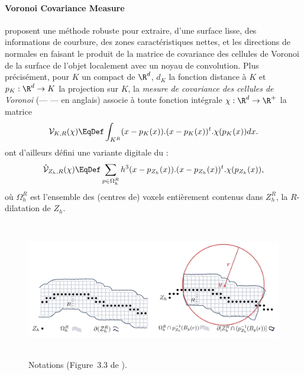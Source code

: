 \paragraph{Voronoi Covariance Measure}

 proposent une méthode robuste pour
extraire, d'une surface lisse, des informations de courbure, des zones caractéristiques
nettes, et les directions de normales en faisant le produit de la matrice de
covariance des cellules de Voronoi de la surface de l'objet localement avec un
noyau de convolution.
Plus précisément, pour $K$ un compact de $\R^d$, $d_K$ la fonction distance à
$K$ et $p_K : \R^d \rightarrow K$ la projection sur $K$, la \emph{mesure de
covariance des cellules de Voronoi} (\VCMM --- \VCM --- en anglais) associe à toute
fonction intégrale $\chi : \R^d \rightarrow \R^+$ la matrice
\begin{equation}
  \mathcal{V}_{K,R}(\chi) \EqDef \int_{K^R} (x - p_K(x)) . (x - p_K(x))^t . \chi(p_K(x))dx \text{.}
\end{equation}
 ont d'ailleurs défini une variante digitale du \VCM :
\begin{equation}
  \hat{\mathcal{V}}_{Z_h,R}(\chi) \EqDef \sum_{p \in \Omega_h^R} h^3 (x - p_{Z_h}(x)) . (x - p_{Z_h}(x))^t . \chi(p_{Z_h}(x)) \text{,}
\end{equation}
où $\Omega_h^R$ est l'ensemble des (centres de) voxels entièrement contenus dans $Z_h^R$, la $R$-dilatation de $Z_h$.

\begin{figure}[ht]{
    \begin{center}
    \includegraphics[height=6cm]{images/Feature/VCMd_notations}
    \end{center}}
    \caption[Notations.]{Notations (Figure~3.3 de \cite{Cuel2014These}).
      \label{fig:mellado-multiscale}}
\end{figure}

